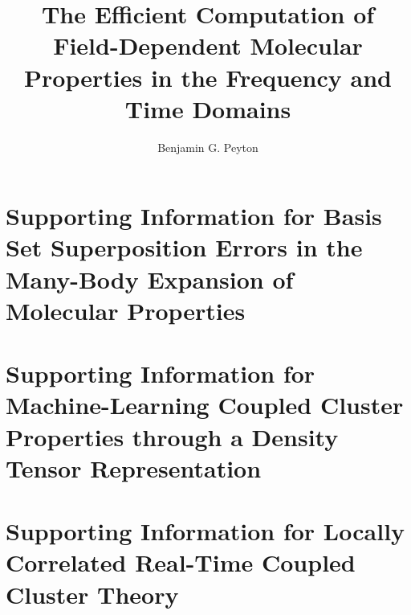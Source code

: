 \documentclass[doublespace,nopageskip]{VTthesis} %
\title{The Efficient Computation of Field-Dependent Molecular Properties in the Frequency and Time Domains}
\author{Benjamin G. Peyton}
\begin{document}
  \frontmatter
  \maketitle
  \tableofcontents

	\listoffigures
	\listoftables

	\mainmatter
    
    
    
    
    
    

    

      
	
%	   

	\appendix
	\begin{appendices}
		\chapter{Supporting Information for Basis Set Superposition Errors in the Many-Body Expansion of Molecular Properties} \label{si:mbe}
        
        \chapter{Supporting Information for Machine-Learning Coupled Cluster Properties through a Density Tensor Representation} \label{si:ml}
        
        \chapter{Supporting Information for Locally Correlated Real-Time Coupled Cluster Theory}
        
	\end{appendices}
\end{document}
